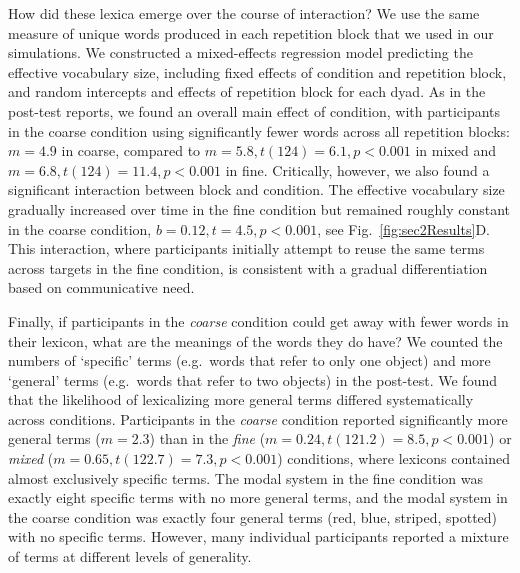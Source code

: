 How did these lexica emerge over the course of interaction? 
We use the same measure of unique words produced in each repetition block that we used in our simulations. 
We constructed a mixed-effects regression model predicting the effective vocabulary size, including fixed effects of condition and repetition block, and random intercepts and effects of repetition block for each dyad. 
As in the post-test reports, we found an overall main effect of condition, with participants in the coarse condition using significantly fewer words across all repetition blocks: $m = 4.9$ in coarse, compared to $m=5.8, t(124)=6.1, p <0.001$ in mixed and $m=6.8, t(124) =11.4, p < 0.001$ in fine.
Critically, however, we also found a significant interaction between block and condition. 
The effective vocabulary size gradually increased over time in the fine condition but remained roughly constant in the coarse condition, $b = 0.12, t = 4.5, p < 0.001$, see Fig.~\ref{fig:sec2Results}D.
This interaction, where participants initially attempt to reuse the same terms across targets in the fine condition, is consistent with a gradual differentiation based on communicative need.

Finally, if participants in the \emph{coarse} condition could get away with fewer words in their lexicon, what are the meanings of the words they do have? 
We counted the numbers of `specific' terms (e.g.~words that refer to only one object) and more `general' terms (e.g.~words that refer to two objects) in the post-test. 
We found that the likelihood of lexicalizing more general terms differed systematically across conditions.
Participants in the \emph{coarse} condition reported significantly more general terms ($m=2.3$) than in the \emph{fine} ($m = 0.24, t(121.2) = 8.5, p < 0.001$) or \emph{mixed} ($m=0.65, t(122.7)= 7.3, p < 0.001$) conditions, where lexicons contained almost exclusively specific terms.
The modal system in the fine condition was exactly eight specific terms with no more general terms, and the modal system in the coarse condition was exactly four general terms (red, blue, striped, spotted) with no specific terms.
However, many individual participants reported a mixture of terms at different levels of generality. 





